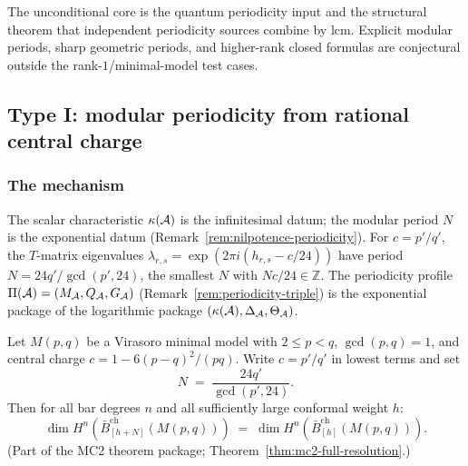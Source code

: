 \begin{remark}\label{rem:periodicity-scope}
The unconditional core is the quantum periodicity input and the
structural theorem that independent periodicity sources combine by lcm.
Explicit modular periods, sharp geometric periods, and higher-rank
closed formulas are conjectural outside the rank-$1$/minimal-model test
cases.
\end{remark}

\subsection{Type I: modular periodicity from rational central charge}

\subsubsection{The mechanism}

\begin{remark}
\label{rem:periodicity-as-exponential}
The scalar characteristic $\kappa(\mathcal{A})$ is the infinitesimal datum; the modular period $N$ is the exponential datum (Remark~\ref{rem:nilpotence-periodicity}).  For $c = p'/q'$, the $T$-matrix eigenvalues $\lambda_{r,s} = \exp(2\pi i(h_{r,s} - c/24))$ have period $N = 24q'/\gcd(p',24)$, the smallest $N$ with $Nc/24 \in \mathbb{Z}$.  The periodicity profile $\Pi(\mathcal{A}) = (M_{\mathcal{A}}, Q_{\mathcal{A}}, G_{\mathcal{A}})$ (Remark~\ref{rem:periodicity-triple}) is the exponential package of the logarithmic package $(\kappa(\mathcal{A}), \Delta_{\mathcal{A}}, \Theta_{\mathcal{A}})$.
\end{remark}

\begin{conjecture}
\label{conj:modular-periodicity-minimal}
Let $M(p,q)$ be a Virasoro minimal model with $2 \leq p < q$, $\gcd(p,q) = 1$,
and central charge $c = 1 - 6(p-q)^2/(pq)$.  Write $c = p'/q'$ in lowest terms
and set
\[
N \;=\; \frac{24q'}{\gcd(p',24)}.
\]
Then for all bar degrees $n$ and all sufficiently large conformal weight $h$:
\[
\dim H^n(\bar{B}_{[h+N]}^{\mathrm{ch}}(M(p,q)))
\;=\;
\dim H^n(\bar{B}_{[h]}^{\mathrm{ch}}(M(p,q))).
\]
(Part of the MC2 theorem package; Theorem~\ref{thm:mc2-full-resolution}.)
\end{conjecture}

